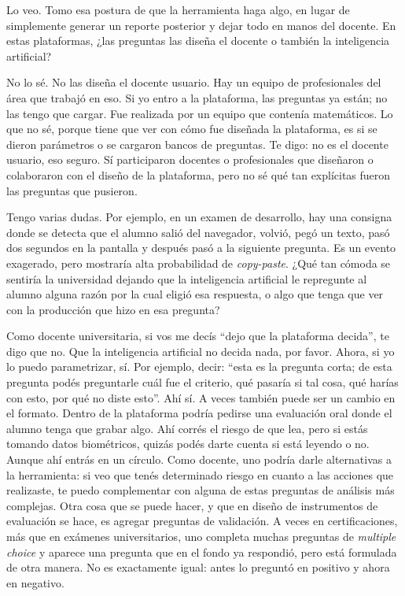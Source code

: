 \begin{description}[leftmargin=0cm, labelsep=0.5cm, style=nextline]
\item[\textbf{Entrevistadores:}] Lo veo. Tomo esa postura de que la herramienta haga algo, en lugar de simplemente generar un reporte posterior y dejar todo en manos del docente. En estas plataformas, ¿las preguntas las diseña el docente o también la inteligencia artificial?
\item[\textbf{Entrevistada:}] No lo sé. No las diseña el docente usuario. Hay un equipo de profesionales del área que trabajó en eso. Si yo entro a la plataforma, las preguntas ya están; no las tengo que cargar.
Fue realizada por un equipo que contenía matemáticos. Lo que no sé, porque tiene que ver con cómo fue diseñada la plataforma, es si se dieron parámetros o se cargaron bancos de preguntas. Te digo: no es el docente usuario, eso seguro. Sí participaron docentes o profesionales que diseñaron o colaboraron con el diseño de la plataforma, pero no sé qué tan explícitas fueron las preguntas que pusieron.
\item[\textbf{Entrevistadores:}] Tengo varias dudas. Por ejemplo, en un examen de desarrollo, hay una consigna donde se detecta que el alumno salió del navegador, volvió, pegó un texto, pasó dos segundos en la pantalla y después pasó a la siguiente pregunta. Es un evento exagerado, pero mostraría alta probabilidad de \textit{copy-paste}.
¿Qué tan cómoda se sentiría la universidad dejando que la inteligencia artificial le repregunte al alumno alguna razón por la cual eligió esa respuesta, o algo que tenga que ver con la producción que hizo en esa pregunta?
\item[\textbf{Entrevistada:}] Como docente universitaria, si vos me decís ``dejo que la plataforma decida'', te digo que no. Que la inteligencia artificial no decida nada, por favor. Ahora, si yo lo puedo parametrizar, sí.
Por ejemplo, decir: ``esta es la pregunta corta; de esta pregunta podés preguntarle cuál fue el criterio, qué pasaría si tal cosa, qué harías con esto, por qué no diste esto''. Ahí sí.
A veces también puede ser un cambio en el formato. Dentro de la plataforma podría pedirse una evaluación oral donde el alumno tenga que grabar algo. Ahí corrés el riesgo de que lea, pero si estás tomando datos biométricos, quizás podés darte cuenta si está leyendo o no. Aunque ahí entrás en un círculo.
Como docente, uno podría darle alternativas a la herramienta: si veo que tenés determinado riesgo en cuanto a las acciones que realizaste, te puedo complementar con alguna de estas preguntas de análisis más complejas.
Otra cosa que se puede hacer, y que en diseño de instrumentos de evaluación se hace, es agregar preguntas de validación. A veces en certificaciones, más que en exámenes universitarios, uno completa muchas preguntas de \textit{multiple choice} y aparece una pregunta que en el fondo ya respondió, pero está formulada de otra manera. No es exactamente igual: antes lo preguntó en positivo y ahora en negativo.

\end{description}
